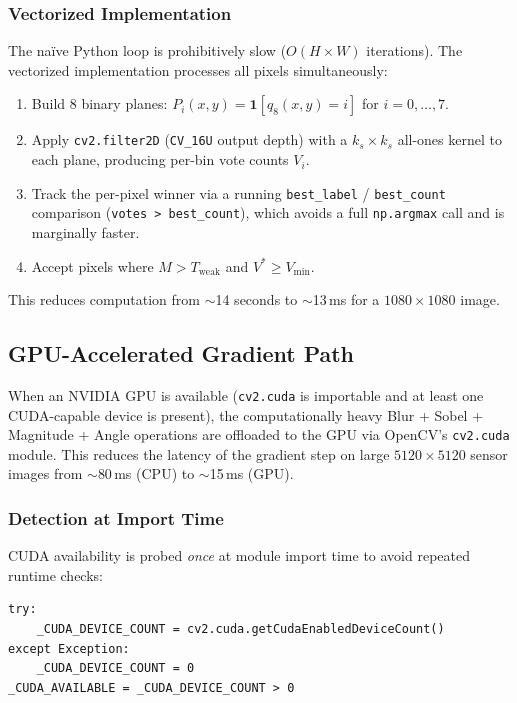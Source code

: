 \documentclass[12pt,a4paper]{article}
\begin{document}
\subsubsection{Vectorized Implementation}
The na\"ive Python loop is prohibitively slow ($O(H \times W)$ iterations).
The vectorized implementation processes all pixels simultaneously:
\begin{enumerate}
  \item Build 8 binary planes: $P_i(x,y) = \mathbf{1}[q_8(x,y) = i]$ for
        $i = 0, \ldots, 7$.
  \item Apply \texttt{cv2.filter2D} (\texttt{CV\_16U} output depth) with a
        $k_s \times k_s$ all-ones kernel to each plane, producing per-bin vote
        counts $V_i$.
  \item Track the per-pixel winner via a running \texttt{best\_label} /
        \texttt{best\_count} comparison (\texttt{votes > best\_count}), which
        avoids a full \texttt{np.argmax} call and is marginally faster.
  \item Accept pixels where $M > T_\text{weak}$ and $V^* \geq V_\text{min}$.
\end{enumerate}
This reduces computation from $\sim$14 seconds to $\sim$13\,ms for a
$1080\times 1080$ image.

\subsection{GPU-Accelerated Gradient Path}
\label{sec:cuda}

When an NVIDIA GPU is available (\texttt{cv2.cuda} is importable and at least one
CUDA-capable device is present), the computationally heavy Blur + Sobel + Magnitude
+ Angle operations are offloaded to the GPU via OpenCV's \texttt{cv2.cuda} module.
This reduces the latency of the gradient step on large $5120 \times 5120$ sensor
images from $\sim$80\,ms (CPU) to $\sim$15\,ms (GPU).

\subsubsection{Detection at Import Time}
CUDA availability is probed \emph{once} at module import time to avoid repeated
runtime checks:

\begin{lstlisting}[style=python, caption={One-shot CUDA detection at import},
                   label={lst:cuda_detect}]
try:
    _CUDA_DEVICE_COUNT = cv2.cuda.getCudaEnabledDeviceCount()
except Exception:
    _CUDA_DEVICE_COUNT = 0
_CUDA_AVAILABLE = _CUDA_DEVICE_COUNT > 0
\end{lstlisting}
\end{document}
